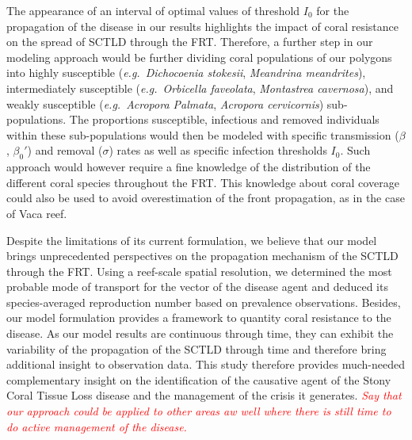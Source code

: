 \documentclass[utf8]{frontiersSCNS}
\newcommand{\emphc}[1]{\emph{\textcolor{red}{#1}}}
\newcommand{\eg}{{\it e.g.}\ }
\begin{document}
The appearance of an interval of optimal values of threshold $I_0$ for the propagation of the disease in our results highlights the impact of coral resistance on the spread of SCTLD through the FRT. Therefore, a further step in our modeling approach would be further dividing coral populations of our polygons into highly susceptible (\eg \textit{Dichocoenia stokesii}, \textit{Meandrina meandrites}), intermediately susceptible (\eg \textit{Orbicella faveolata}, \textit{Montastrea cavernosa}), and weakly susceptible (\eg \textit{Acropora Palmata}, \textit{Acropora cervicornis}) sub-populations. The proportions susceptible, infectious and removed individuals within these sub-populations would then be modeled with specific transmission ($\beta$, $\beta_0'$) and removal ($\sigma$) rates as well as specific infection thresholds $I_0$. Such approach would however require a fine knowledge of the distribution of the different coral species throughout the FRT. This knowledge about coral coverage could also be used to avoid overestimation of the front propagation, as in the case of Vaca reef.

Despite the limitations of its current formulation, we believe that our model brings unprecedented perspectives on the propagation mechanism of the SCTLD through the FRT. Using a reef-scale spatial resolution, we determined the most probable mode of transport for the vector of the disease agent and deduced its species-averaged reproduction number based on prevalence observations. Besides, our model formulation provides a framework to quantity coral resistance to the disease. As our model results are continuous through time, they can exhibit the variability of the propagation of the SCTLD through time and therefore bring additional insight to observation data. This study therefore provides much-needed complementary insight on the identification of the causative agent of the Stony Coral Tissue Loss disease and the management of the crisis it generates. \emphc{Say that our approach could be applied to other areas aw well where there is still time to do active management of the disease.} 

% 
\end{document}
